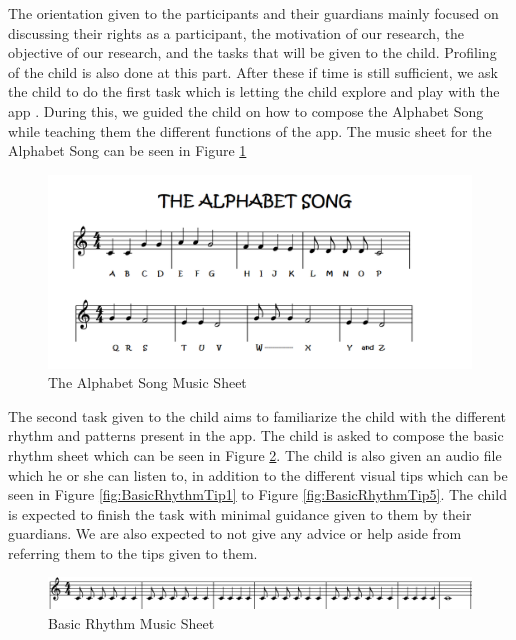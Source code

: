 The orientation given to the participants and their guardians mainly focused on discussing their rights as a participant, the motivation of our research, the objective of our research, and the tasks that will be given to the child. Profiling of the child is also done at this part. After these if time is still sufficient, we ask the child to do the first task which is letting the child explore and play with the app . During this, we guided the child on how to compose the Alphabet Song while teaching them the different functions of the app. The music sheet for the Alphabet Song can be seen in Figure \ref{fig:AlphabetMusicSheet}
\begin{figure}[H]
    \centering
    \includegraphics[width=12cm]{figures/NewFigures/alphabetsongmusicsheet.png}
    \caption{The Alphabet Song Music Sheet}
    \label{fig:AlphabetMusicSheet}
\end{figure}
The second task given to the child aims to familiarize the child with the different rhythm and patterns present in the app. The child is asked to compose the basic rhythm sheet which can be seen in Figure \ref{fig:BasicRhythmMusicSheet}. The child is also given an audio file which he or she can listen to, in addition to the different visual tips which can be seen in Figure \ref{fig:BasicRhythmTip1} to Figure \ref{fig:BasicRhythmTip5}. The child is expected to finish the task with minimal guidance given to them by their guardians. We are also expected to not give any advice or help aside from referring them to the tips given to them.

\begin{figure}[H]
    \centering
    \includegraphics[width=16cm]{figures/NewFigures/BasicRhythmMusicSheet.png}
    \caption{Basic Rhythm Music Sheet}
    \label{fig:BasicRhythmMusicSheet}
\end{figure}

